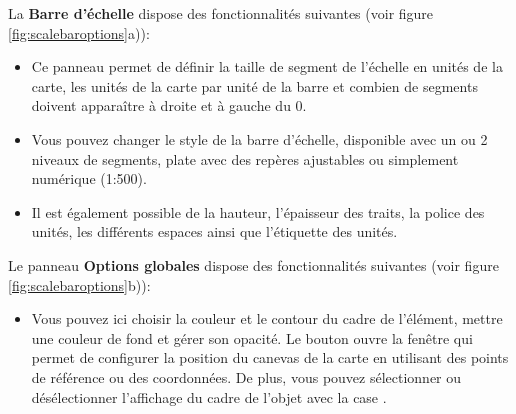
La \textbf{Barre d'échelle} dispose des fonctionnalités suivantes (voir figure \ref{fig:scalebaroptions}a)):

\begin{itemize}[label=--]
\item Ce panneau permet de définir la taille de segment de l'échelle en unités de la carte, les unités de la carte par unité de la barre et combien de segments doivent apparaître à droite et à gauche du 0. 
\item Vous pouvez changer le style de la barre d'échelle, disponible avec un ou 2 niveaux de segments, plate avec des repères ajustables ou simplement numérique (1:500). 
\item Il est également possible de la hauteur, l'épaisseur des traits, la police des unités, les différents espaces ainsi que l'étiquette des unités.
\end{itemize}


Le panneau \textbf{Options globales} dispose des fonctionnalités suivantes (voir figure  \ref{fig:scalebaroptions}b)):

\begin{itemize}[label=--]
\item Vous pouvez ici choisir la couleur et le contour du cadre de l'élément, mettre une couleur de fond et gérer son opacité. Le bouton  ouvre la fenêtre  qui permet de configurer la position du canevas de la carte en utilisant des points de référence ou des coordonnées. De plus, vous pouvez sélectionner ou désélectionner l'affichage du cadre de l'objet avec la case .
\end{itemize}


